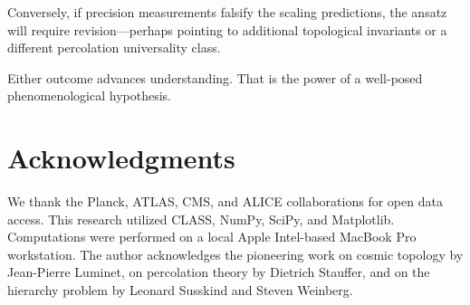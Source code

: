 \documentclass[11pt,a4paper]{article}
\begin{document}
Conversely, if precision measurements falsify the scaling predictions, the 
ansatz will require revision---perhaps pointing to additional topological 
invariants or a different percolation universality class. 

Either outcome advances understanding. That is the power of a well-posed 
phenomenological hypothesis.

\section*{Acknowledgments}
We thank the Planck, ATLAS, CMS, and ALICE collaborations for open data access. 
This research utilized CLASS, NumPy, SciPy, and Matplotlib. Computations were 
performed on a local Apple Intel-based MacBook Pro workstation. The author 
acknowledges the pioneering work on cosmic topology by Jean-Pierre Luminet, 
on percolation theory by Dietrich Stauffer, and on the hierarchy problem by 
Leonard Susskind and Steven Weinberg.
\end{document}
